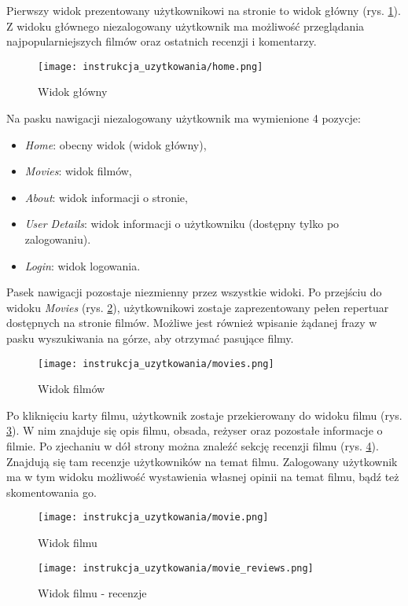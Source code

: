 \documentclass[../main.tex]{subfiles}
\begin{document}
Pierwszy widok prezentowany użytkownikowi na stronie to widok główny (rys. \ref{fig:instrukcja_uzytkowania:home}). Z widoku głównego niezalogowany użytkownik ma możliwość przeglądania najpopularniejszych filmów oraz ostatnich recenzji i komentarzy. 

\begin{figure}[htb]
	\texttt{[image: instrukcja\_uzytkowania/home.png]}
	\caption{Widok główny}
	\label{fig:instrukcja_uzytkowania:home}
\end{figure}

Na pasku nawigacji niezalogowany użytkownik ma wymienione 4 pozycje:
\begin{itemize}
	\item \textit{Home}: obecny widok (widok główny),
	\item \textit{Movies}: widok filmów,
	\item \textit{About}: widok informacji o stronie,
	\item \textit{User Details}: widok informacji o użytkowniku (dostępny tylko po zalogowaniu).
	\item \textit{Login}: widok logowania.
\end{itemize}

Pasek nawigacji pozostaje niezmienny przez wszystkie widoki.
Po przejściu do widoku \textit{Movies} (rys. \ref{fig:instrukcja_uzytkowania:movies}), użytkownikowi zostaje zaprezentowany pełen repertuar dostępnych na stronie filmów. Możliwe jest również wpisanie żądanej frazy w pasku wyszukiwania na górze, aby otrzymać pasujące filmy.

\begin{figure}[htb]
	\texttt{[image: instrukcja\_uzytkowania/movies.png]}
	\caption{Widok filmów}
	\label{fig:instrukcja_uzytkowania:movies}
\end{figure}

Po kliknięciu karty filmu, użytkownik zostaje przekierowany do widoku filmu (rys. \ref{fig:instrukcja_uzytkowania:movie}). W nim znajduje się opis filmu, obsada, reżyser oraz pozostałe informacje o filmie. Po zjechaniu w dół strony można znaleźć sekcję recenzji filmu (rys. \ref{fig:instrukcja_uzytkowania:movie_reviews}). Znajdują się tam recenzje użytkowników na temat filmu. Zalogowany użytkownik ma w tym widoku możliwość wystawienia własnej opinii na temat filmu, bądź też skomentowania go.

\begin{figure}[htb]
	\texttt{[image: instrukcja\_uzytkowania/movie.png]}
	\caption{Widok filmu}
	\label{fig:instrukcja_uzytkowania:movie}
\end{figure}
\begin{figure}[htb]
	\texttt{[image: instrukcja\_uzytkowania/movie\_reviews.png]}
	\caption{Widok filmu - recenzje}
	\label{fig:instrukcja_uzytkowania:movie_reviews}
\end{figure}
\end{document}
